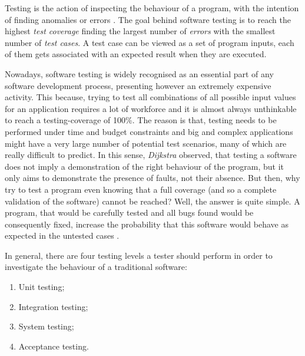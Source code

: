 Testing is the action of inspecting the behaviour of a program, with the intention of finding anomalies or errors \cite{testing}.
The goal behind software testing is to reach the highest \textit{test coverage} finding the largest number of \textit{errors} with the smallest number of \textit{test cases}. A test case can be viewed as a set of program inputs, each of them gets associated with an expected result when they are executed. 

Nowadays, software testing is widely recognised as an essential part of any software development process, presenting however an extremely expensive activity. This because, trying to test all combinations of all possible input values for an application \cite{glinz} requires a lot of workforce and it is almost always unthinkable to reach a testing-coverage of 100\%. 
The reason is that, testing needs to be performed under time and budget constraints \cite{grano} and big and complex applications might have a very large number of potential test scenarios, many of which are really difficult to predict.  In this sense, \textit{Dijkstra} \cite{dijkstra} observed, that testing a software does not imply a demonstration of the right behaviour of the program, but it only aims to demonstrate the presence of faults, not their absence. But then, why try to test a program even knowing that a full coverage (and so a complete validation of the software) cannot be reached? Well, the answer is quite simple. 
A program, that would be carefully tested and all bugs found would be consequently fixed, increase the probability that this software would behave as expected in the untested cases \cite{glinz}. 

In general, there are four testing levels a tester should perform in order to investigate the behaviour of a traditional software: 
\begin{enumerate}
\item Unit testing; 
\item Integration testing; 
\item System testing; 
\item Acceptance testing.
\end{enumerate}

